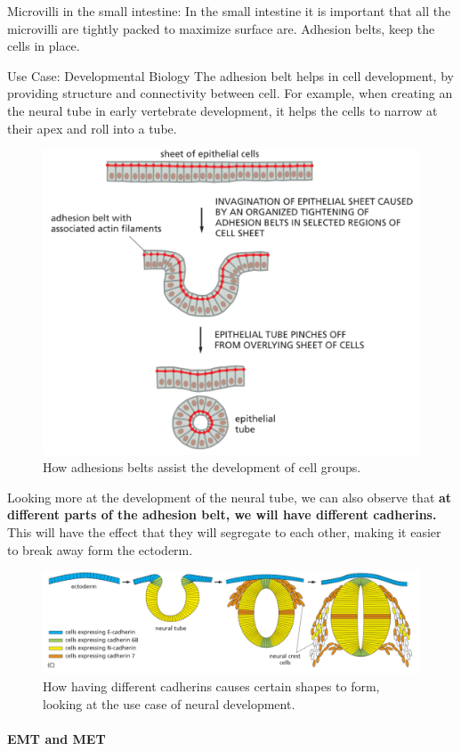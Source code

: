 \documentclass[../main.tex]{subfiles}
\begin{document}
\begin{RemarkWithTitel}{Microvilli in the small intestine:}
	In the small intestine it is important that all the microvilli are tightly packed to maximize surface are. Adhesion belts, keep the cells in place.
\end{RemarkWithTitel}

\begin{RemarkWithTitel}{Use Case: Developmental Biology}
	The adhesion belt helps in cell development, by providing structure and connectivity between cell. For example, when creating an the neural tube in early vertebrate development, it helps the cells to narrow at their apex and roll into a tube.
	
	\begin{figure}[H]
		\centering
		\includegraphics[width=0.4\linewidth]{cad_deve}
		\caption{How adhesions belts assist the development of cell groups.}
		\label{fig:caddeve}
	\end{figure}
	
	Looking more at the development of the neural tube, we can also observe that \textbf{at different parts of the adhesion belt, we will have different cadherins.} This will have the effect that they will segregate to each other, making it easier to break away form the \gls{ectoderm}.
	
	\begin{figure}[H]
		\centering
		\includegraphics[width=0.7\linewidth]{cad_neur}
		\caption{How having different cadherins causes certain shapes to form, looking at the use case of neural development.}
		\label{fig:cadneur}
	\end{figure}
	
\end{RemarkWithTitel}

\paragraph{EMT and MET}
\end{document}

